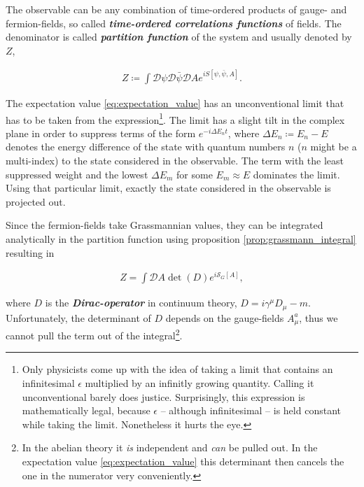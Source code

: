 \documentclass{article}
\theoremstyle{plain} %
\theoremstyle{convention} %
\theoremstyle{remark} %
\def\df#1{\textbf{\textit{#1}}}
\numberwithin{equation}{section}
\begin{document}
The observable can be any combination of time-ordered products of gauge- and fermion-fields, so called \df{time-ordered correlations functions} of fields. The denominator is called \df{partition function} of the system and usually denoted by $Z$,

\begin{align*}
    Z \coloneqq \int \mathcal{D}\psi \mathcal{D} \bar{\psi} \mathcal{D} A e^{iS[\psi, \bar{\psi}, A]}.
\end{align*}

The expectation value \eqref{eq:expectation_value} has an unconventional limit that has to be taken from the expression\footnote{Only physicists come up with the idea of taking a limit that contains an infinitesimal $\epsilon$ multiplied by an infinitly growing quantity. Calling it unconventional barely does justice. Surprisingly, this expression is mathematically legal, because $\epsilon$ -- although infinitesimal -- is held constant while taking the limit. Nonetheless it hurts the eye.}. The limit has a slight tilt in the complex plane in order to suppress terms of the form $e^{-i \Delta E_n t}$, where $\Delta E_n \coloneqq E_n - E$ denotes the energy difference of the state with quantum numbers $n$ ($n$ might be a multi-index) to the state considered in the observable. The term with the least suppressed weight and the lowest $\Delta E_m$ for some $E_m \approx E$ dominates the limit. Using that particular limit, exactly the state considered in the observable is projected out.

Since the fermion-fields take Grassmannian values, they can be integrated analytically in the partition function using proposition \ref{prop:grassmann_integral} resulting in

\begin{align*}
    Z = \int \mathcal{D} A \det(D) e^{i\mathcal{S}_{G}[A]},
\end{align*}

where $D$ is the \df{Dirac-operator} in continuum theory, $D = i\gamma^{\mu} D_{\mu} - m$. Unfortunately, the determinant of $D$ depends on the gauge-fields $A_{\mu}^a$, thus we cannot pull the term out of the integral\footnote{In the abelian theory it \textit{is} independent and \textit{can} be pulled out. In the expectation value \eqref{eq:expectation_value} this determinant then cancels the one in the numerator very conveniently.}.

\end{document}
